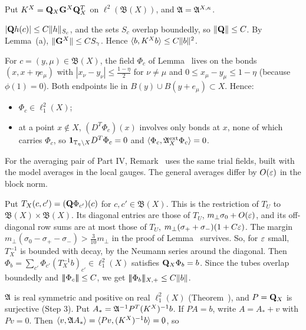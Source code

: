 \begin{detail}\label{d8:35a}
Put $K^X=\mathbf Q_X\mathbf G^X\mathbf Q_X^T$ on $\ell^2(\mathfrak B(X))$, and $\mathfrak A=\mathfrak A^{X,\kappa}$.
\begin{step}
$|\mathbf Q h(c)|\le C\|h\|_{S_c}$, and the sets $S_c$ overlap boundedly, so $\|\mathbf Q\|\le C$. By Lemma~(a), $\|\mathbf G^X\|\le CS_\gamma$. Hence $\langle b,K^Xb\rangle\le C\|b\|^2$.
\end{step}
\begin{step}
For $c=(y,\mu)\in\mathfrak B(X)$, the field $\Phi_c$ of Lemma~ lives on the bonds $(x,x+\eta e_\mu)$ with $|x_\nu-y_\nu|\le\frac{1-\eta}2$ for $\nu\ne\mu$ and $0\le x_\mu-y_\mu\le1-\eta$ (because $\phi(1)=0$). Both endpoints lie in $B(y)\cup B(y+e_\mu)\subset X$. Hence:
\begin{itemize}
\item $\Phi_c\in\ell^2_1(X)$;
\item at a point $x\notin X$, $(D^T\Phi_c)(x)$ involves only bonds at $x$, none of which carries $\Phi_c$, so $\mathbf 1_{\mathbb T_\eta\setminus X}D^T\Phi_c=0$ and $\langle \Phi_c,\mathfrak A^{\rm ext}_X\Phi_c\rangle=0$.
\end{itemize}
For the averaging pair of Part IV, Remark~ uses the same trial fields, built with the model averages in the local gauges. The general averages differ by $O(\varepsilon)$ in the block norm.
\end{step}
\begin{step}
Put $T_X(c,c')=(\mathbf Q\Phi_{c'})(c)$ for $c,c'\in\mathfrak B(X)$. This is the restriction of $T_U$ to $\mathfrak B(X)\times\mathfrak B(X)$. Its diagonal entries are those of $T_U$, $m_\perp\sigma_0+O(\varepsilon)$, and its off-diagonal row sums are at most those of $T_U$, $m_\perp(\sigma_++\sigma_-)(1+C\varepsilon)$. The margin $m_\perp(\sigma_0-\sigma_+-\sigma_-)>\frac3{10}m_\perp$ in the proof of Lemma~ survives. So, for $\varepsilon$ small, $T_X^{-1}$ is bounded with decay, by the Neumann series around the diagonal. Then $\Phi_b=\sum_{c'}\Phi_{c'}(T_X^{-1}b)_{c'}\in\ell^2_1(X)$ satisfies $\mathbf Q_X\Phi_b=b$. Since the tubes overlap boundedly and $|\!|\!|\Phi_c|\!|\!|\le C$, we get $|\!|\!|\Phi_b|\!|\!|_{X,+}\le C\|b\|$.
\end{step}
\begin{step}
$\mathfrak A$ is real symmetric and positive on real $\ell^2_1(X)$ (Theorem~), and $P=\mathbf Q_X$ is surjective (Step 3). Put $A_*=\mathfrak A^{-1}P^T(K^X)^{-1}b$. If $PA=b$, write $A=A_*+v$ with $Pv=0$. Then $\langle v,\mathfrak A A_*\rangle=\langle Pv,(K^X)^{-1}b\rangle=0$, so

\end{step}
\end{detail}
